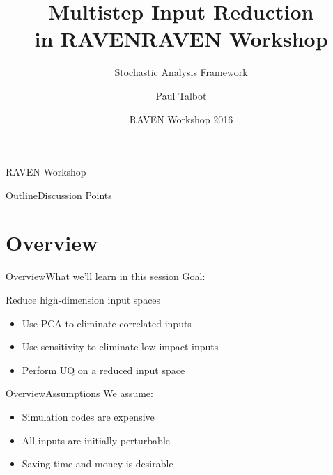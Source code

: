 \documentclass{beamer}
\title[Multistep Input Reduction]
{Multistep Input Reduction \\in RAVEN}
\author[Talbot] %
{Paul Talbot\inst{}}
\institute[University of New Mexico] %
{
  \inst{}
  paul.talbot@inl.gov%
}
\date[RAVEN Workshop] %
{RAVEN Workshop 2016}
\begin{document}
\title[RAVEN Workshop]{RAVEN Workshop}
\subtitle{Stochastic Analysis Framework}

\begin{titleframe}{RAVEN Workshop}
\end{titleframe}

\begin{frame}{Outline}{Discussion Points}\vspace{-20pt}
  \tableofcontents%
\end{frame}

\section{Overview}
\begin{frame}{Overview}{What we'll learn in this session}\vspace{-30pt}
  Goal:

  Reduce high-dimension input spaces
  \vspace{10pt}
  \begin{itemize}
    \item Use PCA to eliminate correlated inputs
    \item Use sensitivity to eliminate low-impact inputs
    \item Perform UQ on a reduced input space
  \end{itemize}
\end{frame}

\begin{frame}{Overview}{Assumptions}\vspace{-30pt}
  We assume:
  \begin{itemize}
    \item Simulation codes are expensive
    \item All inputs are initially perturbable
    \item Saving time and money is desirable
  \end{itemize}
\end{frame}
\end{document}
